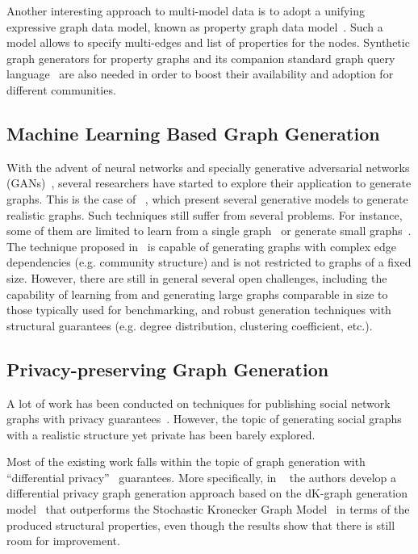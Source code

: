 Another interesting approach to multi-model data is to adopt a unifying
expressive graph data model, known as property graph data
model~\cite{BFVY18}. Such a model allows to specify multi-edges and list of
properties for the nodes. Synthetic graph generators for property graphs and its
companion standard graph query language~\cite{Angles18,AnglesABBFGLPPS18} are also needed in order to boost
their availability and adoption for different communities.


\subsection{Machine Learning Based Graph Generation}

With the advent of neural networks and specially generative adversarial networks
(GANs)~\cite{goodfellow2014generative}, several researchers have started to
explore their application to generate graphs. This is the case of
~\cite{kipf2016variational,grover2018graphite,simonovsky2018graphvae,li2018learning,you2018graphrnn},
which present several generative models to generate realistic graphs.  Such
techniques still suffer from several problems. For instance, some of them are
limited to learn from a single
graph~\cite{kipf2016variational,grover2018graphite} or generate small
graphs~\cite{simonovsky2018graphvae,li2018learning,you2018graphrnn}. The
technique proposed in~\cite{you2018graphrnn} is capable of generating graphs
with complex edge dependencies (e.g. community structure) and is not restricted
to graphs of a fixed size. However, there are still in general several open
challenges, including the capability of learning from and generating large graphs comparable
in size to those typically used for benchmarking, and robust generation
techniques with structural guarantees (e.g. degree distribution, clustering
coefficient, etc.).

\subsection{Privacy-preserving Graph Generation}

A lot of work has been conducted on techniques for publishing social network
graphs with privacy guarantees~\cite{wu2010survey}. However, the topic of
generating social graphs with a realistic structure yet private has been barely explored.

Most of the existing work falls within the topic of graph generation with ``differential
privacy''~\cite{dwork2009differential} guarantees. More specifically, in
~\cite{wang2013preserving} the authors develop a differential privacy graph
generation approach based on the dK-graph generation
model~\cite{mahadevan2006systematic} that outperforms the Stochastic Kronecker
Graph Model~\cite{Leskovec:2005:RMT:2101235.2101254} in terms of the produced structural properties,
even though the results show that there is still room for improvement.

